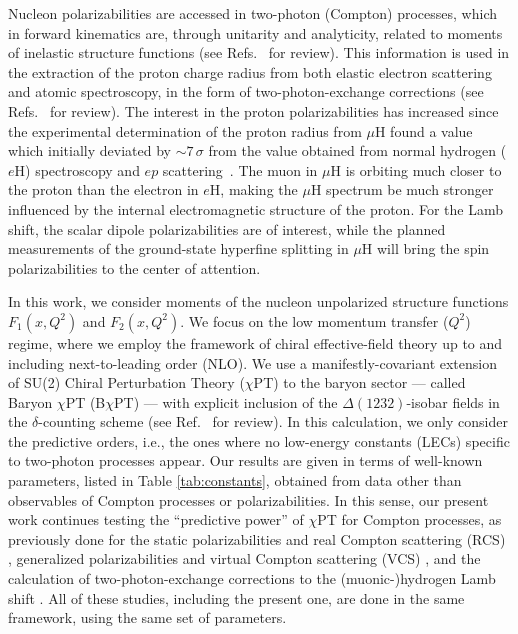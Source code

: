 \documentclass[11pt,preprint,tightenlines,
showpacs,preprintnumbers,amsmath,amssymb,superscriptaddress,a4paper,nofootinbib]{revtex4-1}
\def\de{\delta} \def\De{\Delta}
\begin{document}
Nucleon polarizabilities are accessed in two-photon (Compton) processes,
which in forward kinematics are, through unitarity and analyticity, related to
 moments of inelastic structure functions (see Refs.~\cite{Drechsel:2002ar,Kuhn:2008sy,Hagelstein:2015egb,Pasquini:2018wbl} for review).
This information is used in the extraction of the proton charge radius from
both  elastic electron scattering and atomic spectroscopy, in the form of two-photon-exchange corrections (see Refs.~\cite{Carlson:2007aa,Arrington:2011dn,Afanasev:2017gsk} for review). The interest in the proton polarizabilities has increased since the experimental determination of the proton radius from $\mu$H \cite{Pohl:2010zza,Antognini:1900ns} found a value which initially deviated by $\sim 7\,\sigma$ from the value obtained from normal hydrogen ($e$H) spectroscopy and $ep$ scattering~\cite{Mohr:2012aa}.
 The muon in $\mu$H is orbiting much closer to the proton than the electron in $e$H, making the $\mu$H spectrum be much stronger influenced by the internal electromagnetic structure of the proton. For the Lamb shift, the scalar dipole polarizabilities are of interest, while the planned measurements of the ground-state hyperfine splitting in $\mu$H \cite{Pohl:2016xsr} will bring the spin polarizabilities to the center of attention.



In this work, we consider moments of the nucleon unpolarized structure functions $F_{1}(x, Q^2)$ and $F_{2}(x, Q^2)$.
We focus on the low momentum transfer ($Q^2$) regime, where we employ the framework of chiral effective-field theory up to and including next-to-leading order (NLO). 
We use a manifestly-covariant extension of SU(2) Chiral Perturbation Theory ($\chi$PT) \cite{Weinberg:1978kz,Gasser:1983yg} to the baryon sector \cite{Gasser:1987rb,Gegelia:1999gf,Fuchs:2003qc} --- called Baryon $\chi$PT (B$\chi$PT) --- with explicit 
inclusion of the $\Delta(1232)$-isobar fields in the $\de$-counting scheme
\cite{Pascalutsa:2003aa} (see Ref.~\cite[Sec.~4]{Pascalutsa:2006up} for review).
In this calculation, we only consider the predictive orders, i.e., the ones where no
low-energy constants (LECs) specific to two-photon processes appear. 
Our results are given in terms of well-known parameters,
listed in Table \ref{tab:constants}, obtained from data other than observables of Compton processes or  polarizabilities.
In this sense, our present work continues testing the  ``predictive power''  of $\chi$PT for Compton processes,  as previously done for the static polarizabilities and real Compton scattering (RCS) \cite{Lensky:2009uv, Lensky:2015awa}, 
generalized polarizabilities and virtual Compton scattering (VCS) \cite{Lensky:2016nui},
and the calculation of two-photon-exchange corrections to the \mbox{(muonic-)}hydrogen
Lamb shift \cite{Alarcon:2013cba,Lensky:2017bwi}. All of these studies, 
including the present one, are done in the same framework, using the same set of parameters.
\end{document}
